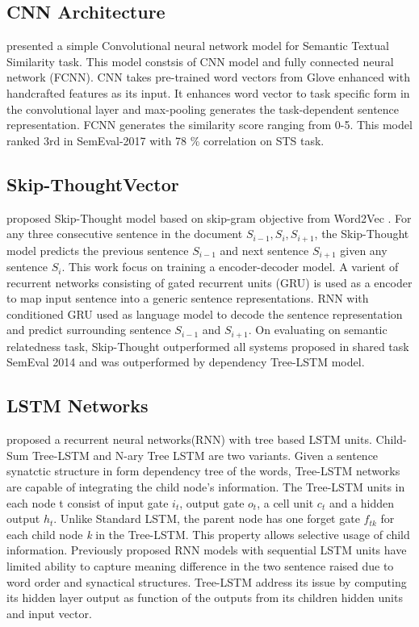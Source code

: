 \documentclass[12pt]{article} %
\begin{document}
\subsection{CNN Architecture} 
\cite{shao2017hcti} presented a simple Convolutional neural network model for Semantic Textual Similarity task. This model constsis of CNN model and fully connected neural network (FCNN). CNN takes pre-trained word vectors from Glove \cite{pennington2014glove} enhanced with handcrafted features as its input. It enhances word vector to task specific form in the convolutional layer and max-pooling generates the task-dependent sentence representation. FCNN generates the similarity score ranging from 0-5. This model ranked 3rd in SemEval-2017 with 78 \% correlation on STS task. 

\subsection{Skip-ThoughtVector}
 \cite{kiros2015skip} proposed Skip-Thought model based on skip-gram objective from Word2Vec \cite{mikolov2014word2vec}. For any three consecutive sentence in the document $S_{i-1}, S_{i}, S_{i+1}$, the Skip-Thought model predicts the previous sentence $S_{i-1}$ and next sentence $S_{i+1}$ given any sentence $S_{i}$.
This work focus on training a encoder-decoder model. A varient of recurrent networks consisting of gated recurrent units (GRU) \cite{cho2014learning} is used as a encoder to map input sentence into a generic sentence representations. RNN with conditioned GRU used as language model to decode the sentence representation and predict surrounding sentence $S_{i-1}$ and $S_{i+1}$. On evaluating on semantic relatedness task, Skip-Thought outperformed all systems proposed in shared task SemEval 2014 \cite{marelli2014semeval} and was outperformed by dependency Tree-LSTM model.


\subsection{LSTM Networks} 

\cite{tai2015improved} proposed a recurrent neural networks(RNN) with tree based LSTM units. Child-Sum Tree-LSTM and N-ary Tree LSTM are two variants. Given a sentence synatctic structure in form dependency tree of the words, Tree-LSTM networks are capable of integrating the child node's information. The Tree-LSTM units in each node t consist of input gate $i_{t}$, output gate $o_{t}$, a cell unit $c_{t}$ and a hidden output $h_{t}$. Unlike Standard LSTM, the parent node has one forget gate $f_{tk}$ for each child node \textit{k} in the Tree-LSTM. This property allows selective usage of child information. Previously proposed RNN models with sequential LSTM units have limited ability to capture meaning difference in the two sentence raised due to word order and synactical structures. Tree-LSTM address its issue by computing its hidden layer output as function of the outputs from its children hidden units and input vector. 
\end{document}
